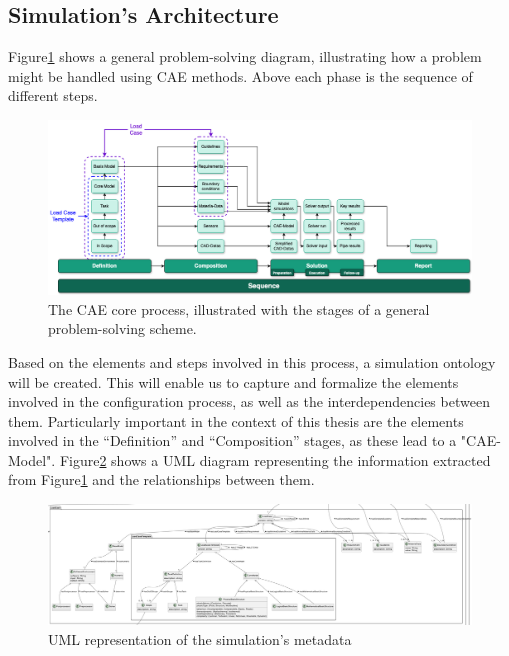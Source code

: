 \subsection{Simulation's Architecture}
Figure\ref{fig:cea-proc} shows a general problem-solving diagram, illustrating how a problem might be handled using CAE methods. Above each phase is the sequence of different steps.\\

\begin{figure}[h]
    \centering
    \includegraphics[width=\textwidth]{images/Concept-cae-process.drawio.png}
    \caption{\label{fig:cea-proc}  The CAE core process, illustrated with the stages of a general problem-solving scheme. \cite{assistSim}}
\end{figure}

Based on the elements and steps involved in this process, a simulation ontology will be created. This will enable us to capture and formalize the elements involved in the configuration process, as well as the interdependencies between them. Particularly important in the context of this thesis are the elements involved in the “Definition” and “Composition” stages, as these lead to a "CAE-Model". Figure\ref{fig:uml-sim} shows a UML diagram representing the information extracted from Figure\ref{fig:cea-proc} and the relationships between them.\\

\begin{figure}[h]
    \centering
    \includegraphics[width=\textwidth]{images/UML-Sim.png}
    \caption{\label{fig:uml-sim}  UML representation of the simulation’s metadata}
\end{figure}


